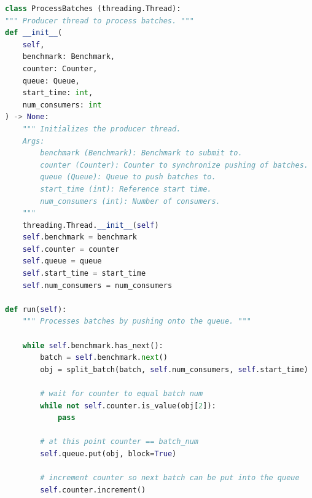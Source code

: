 \begin{minipage}{0.9\linewidth}
\begin{lstlisting}[caption={Stream Processing Batch}, label={lst:createDataFrame4},language=Python]
class ProcessBatches (threading.Thread):
""" Producer thread to process batches. """
def __init__(
    self,
    benchmark: Benchmark,
    counter: Counter,
    queue: Queue,
    start_time: int,
    num_consumers: int
) -> None:
    """ Initializes the producer thread.
    Args:
        benchmark (Benchmark): Benchmark to submit to.
        counter (Counter): Counter to synchronize pushing of batches.
        queue (Queue): Queue to push batches to.
        start_time (int): Reference start time.
        num_consumers (int): Number of consumers.
    """
    threading.Thread.__init__(self)
    self.benchmark = benchmark
    self.counter = counter
    self.queue = queue
    self.start_time = start_time
    self.num_consumers = num_consumers        

def run(self):
    """ Processes batches by pushing onto the queue. """

    while self.benchmark.has_next():
        batch = self.benchmark.next()
        obj = split_batch(batch, self.num_consumers, self.start_time)
        
        # wait for counter to equal batch num 
        while not self.counter.is_value(obj[2]):
            pass

        # at this point counter == batch_num
        self.queue.put(obj, block=True)

        # increment counter so next batch can be put into the queue
        self.counter.increment()
\end{lstlisting}
\end{minipage}
    
    


